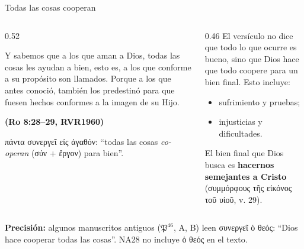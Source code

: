 \documentclass[hyperref={bookmarks=false},aspectratio=169]{beamer}
\newcommand{\grc}[1]{\foreignlanguage{ancientgreek}{#1}}
\newcommand{\fuente}[1]{\par\hfill{\upshape\bfseries\footnotesize\textcolor{azul}{#1}}}
\newcommand{\destacar}[1]{\textbf{\textcolor{azul}{#1}}}
\newcommand{\precision}[1]{{\footnotesize\color{gris}\textbf{Precisión:} #1}}
\begin{document}
\begin{frame}{Todas las cosas cooperan}
\begin{columns}[t,onlytextwidth]
\begin{column}{0.52\textwidth}
\begin{cita}Y sabemos que a los que aman a Dios, todas las cosas les ayudan a bien, esto es, a los que conforme a su propósito son llamados. Porque a los que antes conoció, también los predestinó para que fuesen hechos conformes a la imagen de su Hijo.\fuente{(Ro 8:28--29, RVR1960)}\end{cita}
\scriptsize\grc{πάντα συνεργεῖ εἰς ἀγαθόν}: ``todas las cosas \emph{co-operan} (\grc{σύν} + \grc{ἔργον}) para bien''.
\end{column}
\begin{column}{0.46\textwidth}\small
El versículo no dice que todo lo que ocurre es bueno, sino que Dios hace que todo coopere para un bien final. Esto incluye:
\begin{itemize}
\item sufrimiento y pruebas;
\item injusticias y dificultades.
\end{itemize}
El bien final que Dios busca es \destacar{hacernos semejantes a Cristo} (\grc{συμμόρφους τῆς εἰκόνος τοῦ υἱοῦ}, v. 29).
\end{column}
\end{columns}
\precision{algunos manuscritos antiguos (\(\mathfrak{P}^{46}\), A, B) leen \grc{συνεργεῖ ὁ θεός}: ``Dios hace cooperar todas las cosas''. NA28 no incluye \grc{ὁ θεός} en el texto.}
\end{frame}
\end{document}
